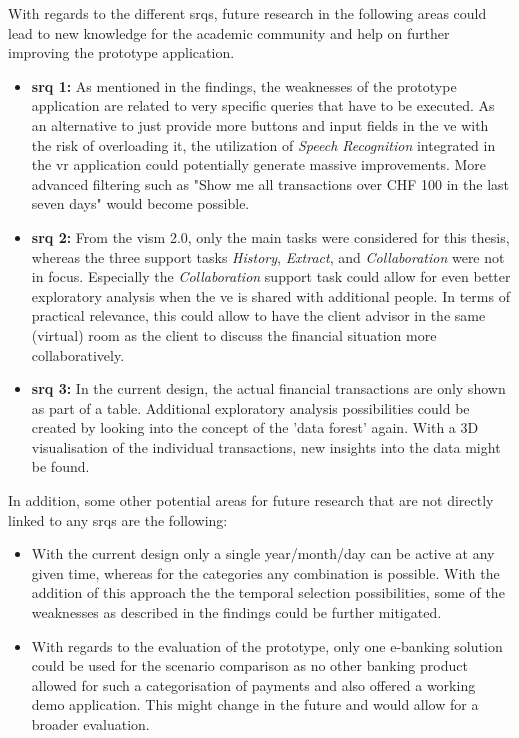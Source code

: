 With regards to the different \glspl{srq}, future research in the following areas could lead to new knowledge for the academic community and help on further improving the prototype application.
\begin{itemize}[]
	\item \textbf{\gls{srq} 1:} As mentioned in the findings, the weaknesses of the prototype application are related to very specific queries that have to be executed. As an alternative to just provide more buttons and input fields in the \gls{ve} with the risk of overloading it, the utilization of \textit{Speech Recognition} integrated in the \gls{vr} application could potentially generate massive improvements. More advanced filtering such as "Show me all transactions over CHF 100 in the last seven days" would become possible.
	
	\item \textbf{\gls{srq} 2:} From the \gls{vism} 2.0, only the main tasks were considered for this thesis, whereas the three support tasks \textit{History}, \textit{Extract}, and \textit{Collaboration} were not in focus. Especially the \textit{Collaboration} support task could allow for even better exploratory analysis when the \gls{ve} is shared with additional people. In terms of practical relevance, this could allow to have the client advisor in the same (virtual) room as the client to discuss the financial situation more collaboratively.
	
	\item \textbf{\gls{srq} 3:} In the current design, the actual financial transactions are only shown as part of a table. Additional exploratory analysis possibilities could be created by looking into the concept of the 'data forest' again. With a 3D visualisation of the individual transactions, new insights into the data might be found.
\end{itemize}
In addition, some other potential areas for future research that are not directly linked to any \glspl{srq} are the following:
\begin{itemize}[]
	\item With the current design only a single year/month/day can be active at any given time, whereas for the categories any combination is possible. With the addition of this approach the the temporal selection possibilities, some of the weaknesses as described in the findings could be further mitigated.
	
	\item With regards to the evaluation of the prototype, only one e-banking solution could be used for the scenario comparison as no other banking product allowed for such a categorisation of payments and also offered a working demo application. This might change in the future and would allow for a broader evaluation.
\end{itemize}

